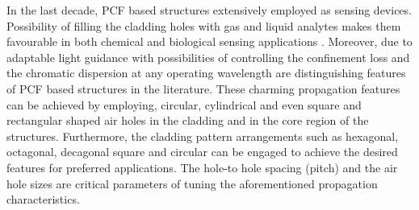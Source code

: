 \documentclass[10pt]{IEEEtran}
\begin{document}
In the last decade, PCF based structures extensively employed as sensing devices. Possibility of filling the cladding holes with gas and liquid analytes makes them favourable in both chemical and biological sensing applications \cite{wang2011selectively,rifat2016highly,caucheteur2015review,dash2014spr}. Moreover, due to adaptable light guidance with possibilities of controlling the confinement loss and the chromatic dispersion at any operating wavelength are distinguishing features of PCF based structures in the literature. These charming propagation features can be achieved by employing, circular, cylindrical and even square and rectangular shaped \cite{wang2015simulation} air holes in the cladding and in the core region of the structures. Furthermore, the cladding pattern arrangements such as hexagonal, octagonal, decagonal square and circular \cite{wang2011selectively,bouk2004dispersion,ademgil2014highly,razzak2007chromatic}  can be engaged to achieve the desired features for preferred applications. The hole-to hole spacing (pitch) and the air hole sizes are critical parameters of tuning the aforementioned propagation characteristics.
\end{document}
